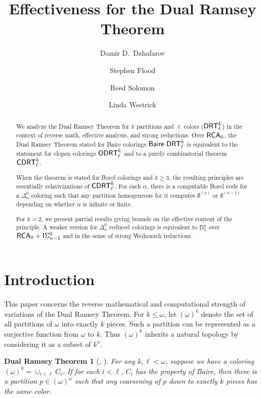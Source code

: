 \documentclass{amsart}
\title{Effectiveness for the Dual Ramsey Theorem}
\author{Damir D.~Dzhafarov}
\author{Stephen Flood}
\author{Reed Solomon}
\author{Linda Westrick}
\newtheorem*{dualramsey}{Dual Ramsey Theorem}
\theoremstyle{definition}
\theoremstyle{remark}
\newcommand{\system}[1]{\mbox{\fontfamily{cmss}\fontshape{n}\fontseries{m}%
    \selectfont#1}}
\newcommand{\RCA}{\system{RCA}\ensuremath{_0}}
\newcommand{\DRT}{\system{DRT}}
\newcommand{\BaDRT}{\system{Baire-DRT}}
\newcommand{\cDRT}{\system{CDRT}}
\newcommand{\ODRT}{\system{ODRT}}
\begin{document}
\begin{abstract}We analyze the Dual Ramsey Theorem 
for $k$ partitions and $\ell$ colors ($\DRT^k_\ell$) in the context of 
reverse math, effective analysis, and strong reductions.  Over $\RCA$, the Dual Ramsey Theorem 
stated for Baire colorings $\BaDRT^k_\ell$ is equivalent to the statement for clopen colorings 
$\ODRT^k_\ell$ and to a purely combinatorial theorem $\cDRT^k_\ell$. 

When the theorem is stated for Borel colorings and $k\geq 3$,  
the resulting principles are essentially relativizations of $\cDRT^k_\ell$.  
For each $\alpha$, there is a computable Borel code for a 
$\Delta^0_\alpha$ coloring such that any partition homogeneous for it
computes $\emptyset^{(\alpha)}$ or $\emptyset^{(\alpha-1)}$ depending 
on whether $\alpha$ is infinite or finite.  

For $k=2$, we present partial results giving bounds on the effective content of the principle.  
A weaker version for $\Delta^0_n$ reduced colorings is equivalent to 
$\mathsf{D}^n_2$ over $\RCA+\mathsf{I}\Sigma^0_{n-1}$ and in the sense 
of strong Weihrauch reductions.
\end{abstract}


\maketitle




\section{Introduction}
\label{sec:intro}

This paper concerns the reverse mathematical and computational strength of 
variations of the Dual Ramsey Theorem.  For $k \leq \omega$, 
let $(\omega)^k$ denote the
set of all partitions of $\omega$ into exactly $k$ pieces.
Such a partition can be represented as a surjective function from 
$\omega$ to $k$.  Thus $(\omega)^k$ inherits a natural topology
by considering it as a subset 
of $k^\omega$.

\begin{dualramsey}[\cite{cs}, \cite{pv}]
For any $k,\ell < \omega$,
suppose we have a coloring $(\omega)^k = \cup_{i<\ell} C_i$.  If for each
$i<\ell$, $C_i$
has the property of Baire, 
then there is a partition $p \in (\omega)^\omega$ 
such that any coarsening of $p$ down to 
exactly $k$ pieces has the same color.
\end{dualramsey} 
\end{document}
